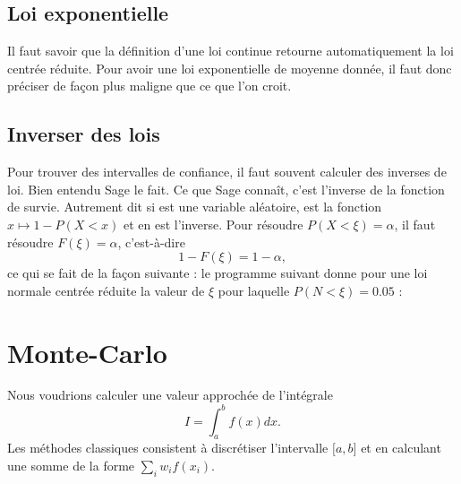 \subsection{Loi exponentielle}

Il faut savoir que la définition d'une loi continue retourne automatiquement la loi centrée réduite. Pour avoir une loi exponentielle de moyenne donnée, il faut donc préciser de façon plus maligne que ce que l'on croit.



\subsection{Inverser des lois}

Pour trouver des intervalles de confiance, il faut souvent calculer des inverses de loi. Bien entendu Sage le fait. Ce que Sage connaît, c'est l'inverse de la fonction de survie. Autrement dit si  est une variable aléatoire,  est la fonction \( x\mapsto 1-P(X<x)\) et  en est l'inverse. Pour résoudre \( P(X<\xi)=\alpha\), il faut résoudre \( F(\xi)=\alpha\), c'est-à-dire
\begin{equation}
	1-F(\xi)=1-\alpha,
\end{equation}
ce qui se fait de la façon suivante : le programme suivant donne pour une loi normale centrée réduite la valeur de \( \xi\) pour laquelle \( P(N<\xi)=0.05\) :


\section{Monte-Carlo}

Nous voudrions calculer une valeur approchée de l'intégrale
\begin{equation}
	I=\int_a^bf(x)dx.
\end{equation}
Les méthodes classiques consistent à discrétiser l'intervalle \( \mathopen[ a , b \mathclose]\) et en calculant une somme de la forme \( \sum_iw_if(x_i)\).

